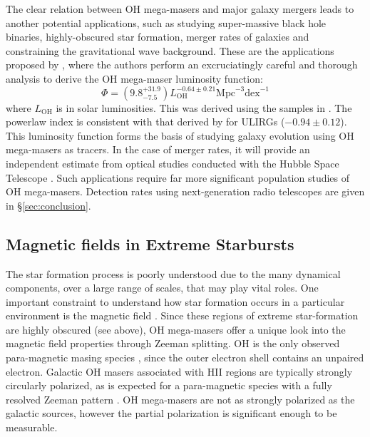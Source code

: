 The clear relation between OH mega-masers and major galaxy mergers leads to another potential applications, such as studying super-massive black hole binaries, highly-obscured star formation, merger rates of galaxies \citep{darling_2001_merger} and constraining the gravitational wave background. These are the applications proposed by \citet{darlin2002_lumfunc}, where the authors perform an excruciatingly careful and thorough analysis to derive the OH mega-maser luminosity function:
\begin{equation}
\label{eq:oh_lum}
\Phi = \left( 9.8^{+31.9}_{-7.5} \right)L_{\mathrm{OH}}^{-0.64\pm0.21} \mathrm{Mpc}^{-3} \mathrm{dex}^{-1}
\end{equation}
where $L_{\mathrm{OH}}$ is in solar luminosities. This was derived using the samples in \citet{darling2002_paperIII}. The powerlaw index is consistent with that derived by \citet{Kim_1998} for ULIRGs ($-0.94\pm0.12$). This luminosity function forms the basis of studying galaxy evolution using OH mega-masers as tracers. In the case of merger rates, it will provide an independent estimate from optical studies conducted with the Hubble Space Telescope \citep{Kim_1998}. Such applications require far more significant population studies of OH mega-masers. Detection rates using next-generation radio telescopes are given in \S\ref{sec:conclusion}.

\subsection{Magnetic fields in Extreme Starbursts}
\label{sub:oh_zeeman}

The star formation process is poorly understood due to the many dynamical components, over a large range of scales, that may play vital roles. One important constraint to understand how star formation occurs in a particular environment is the magnetic field \citep{McKee:2007bd}. Since these regions of extreme star-formation are highly obscured (see above), OH mega-masers offer a unique look into the magnetic field properties through Zeeman splitting. OH is the only observed para-magnetic masing species \citep{Elitzur1992_text}, since the outer electron shell contains an unpaired electron. Galactic OH masers associated with HII regions are typically strongly circularly polarized, as is expected for a para-magnetic species with a fully resolved Zeeman pattern \citep{Elitzur1992_text}. OH mega-masers are not as strongly polarized as the galactic sources, however the partial polarization is significant enough to be measurable.

